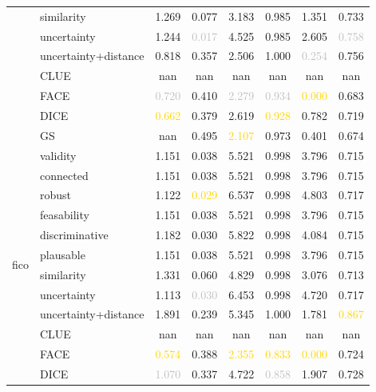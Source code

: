 \begin{table}[ht]
\begin{tabular}{l l c c c c c c}
 & similarity & 1.269 & 0.077 & 3.183 & 0.985 & 1.351 & 0.733 \\
 & uncertainty & 1.244 & \textcolor{silver}{0.017} & 4.525 & 0.985 & 2.605 & \textcolor{silver}{0.758} \\
 & uncertainty+distance & \textcolor{bronze}{0.818} & 0.357 & \textcolor{bronze}{2.506} & 1.000 & \textcolor{silver}{0.254} & \textcolor{bronze}{0.756} \\
 & CLUE & nan & nan & nan & nan & nan & nan \\
 & FACE & \textcolor{silver}{0.720} & 0.410 & \textcolor{silver}{2.279} & \textcolor{silver}{0.934} & \textcolor{gold}{0.000} & 0.683 \\
 & DICE & \textcolor{gold}{0.662} & 0.379 & 2.619 & \textcolor{gold}{0.928} & 0.782 & 0.719 \\
 & GS & nan & 0.495 & \textcolor{gold}{2.107} & \textcolor{bronze}{0.973} & \textcolor{bronze}{0.401} & 0.674 \\
\hline
\multirow{13}{*}{fico} & validity & 1.151 & 0.038 & 5.521 & \textcolor{bronze}{0.998} & 3.796 & 0.715 \\
 & connected & 1.151 & 0.038 & 5.521 & \textcolor{bronze}{0.998} & 3.796 & 0.715 \\
 & robust & 1.122 & \textcolor{gold}{0.029} & 6.537 & \textcolor{bronze}{0.998} & 4.803 & 0.717 \\
 & feasability & 1.151 & 0.038 & 5.521 & \textcolor{bronze}{0.998} & 3.796 & 0.715 \\
 & discriminative & 1.182 & \textcolor{bronze}{0.030} & 5.822 & \textcolor{bronze}{0.998} & 4.084 & 0.715 \\
 & plausable & 1.151 & 0.038 & 5.521 & \textcolor{bronze}{0.998} & 3.796 & 0.715 \\
 & similarity & 1.331 & 0.060 & 4.829 & \textcolor{bronze}{0.998} & 3.076 & 0.713 \\
 & uncertainty & \textcolor{bronze}{1.113} & \textcolor{silver}{0.030} & 6.453 & \textcolor{bronze}{0.998} & 4.720 & 0.717 \\
 & uncertainty+distance & 1.891 & 0.239 & 5.345 & 1.000 & \textcolor{bronze}{1.781} & \textcolor{gold}{0.867} \\
 & CLUE & nan & nan & nan & nan & nan & nan \\
 & FACE & \textcolor{gold}{0.574} & 0.388 & \textcolor{gold}{2.355} & \textcolor{gold}{0.833} & \textcolor{gold}{0.000} & 0.724 \\
 & DICE & \textcolor{silver}{1.070} & 0.337 & \textcolor{bronze}{4.722} & \textcolor{silver}{0.858} & 1.907 & \textcolor{bronze}{0.728} \\

\end{tabular}
\end{table}
